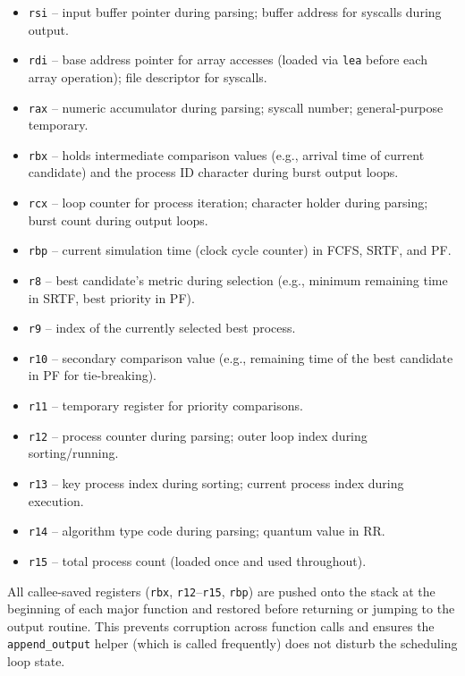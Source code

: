 \documentclass[a4paper,12pt]{article}
\begin{document}
\begin{itemize}
    \item \texttt{rsi} -- input buffer pointer during parsing; buffer address for syscalls during output.
    \item \texttt{rdi} -- base address pointer for array accesses (loaded via \texttt{lea} before each array operation); file descriptor for syscalls.
    \item \texttt{rax} -- numeric accumulator during parsing; syscall number; general-purpose temporary.
    \item \texttt{rbx} -- holds intermediate comparison values (e.g., arrival time of current candidate) and the process ID character during burst output loops.
    \item \texttt{rcx} -- loop counter for process iteration; character holder during parsing; burst count during output loops.
    \item \texttt{rbp} -- current simulation time (clock cycle counter) in FCFS, SRTF, and PF.
    \item \texttt{r8} -- best candidate's metric during selection (e.g., minimum remaining time in SRTF, best priority in PF).
    \item \texttt{r9} -- index of the currently selected best process.
    \item \texttt{r10} -- secondary comparison value (e.g., remaining time of the best candidate in PF for tie-breaking).
    \item \texttt{r11} -- temporary register for priority comparisons.
    \item \texttt{r12} -- process counter during parsing; outer loop index during sorting/running.
    \item \texttt{r13} -- key process index during sorting; current process index during execution.
    \item \texttt{r14} -- algorithm type code during parsing; quantum value in RR.
    \item \texttt{r15} -- total process count (loaded once and used throughout).
\end{itemize}

All callee-saved registers (\texttt{rbx}, \texttt{r12}--\texttt{r15}, \texttt{rbp}) are pushed onto the stack at the beginning of each major function and restored before returning or jumping to the output routine. This prevents corruption across function calls and ensures the \texttt{append\_output} helper (which is called frequently) does not disturb the scheduling loop state.
\end{document}

